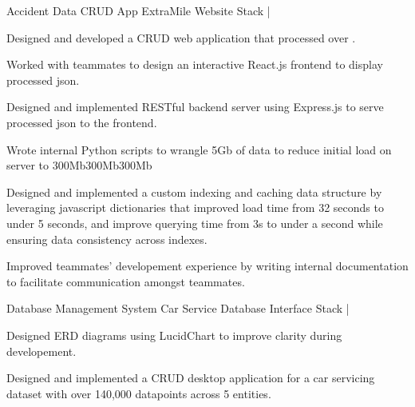 \begin{cventries}
    \cventry
    {Accident Data CRUD App} %
    {ExtraMile Website} %
    {\href{https://github.com/giathuan123/extramile}{\faGithubSquare}} %
    {Stack | \diExpressOriginal \diReactPlainWordmark \diNodejsPlain \diPythonPlain } %
    {
        \begin{cvitems} %
        \item{Designed and developed a CRUD web application that processed over . }
        \item{Worked with teammates to design an interactive React.js frontend to display processed json.}
        \item{Designed and implemented RESTful backend server using Express.js to serve processed json to the frontend. }
        \item{Wrote internal Python scripts to wrangle 5Gb of data to reduce initial load on server to 300Mb300Mb300Mb }
        \item{Designed and implemented a custom indexing and caching data structure by leveraging javascript dictionaries that improved load time from 32 seconds to under 5 seconds, and improve querying time from 3s to under a second while ensuring data consistency across indexes. }
        \item{Improved teammates' developement experience by writing internal documentation to facilitate communication amongst teammates. }
        \end{cvitems}
    }
    \cventry
    {Database Management System} %
    {Car Service Database Interface} %
    {\href{https://github.com/giathuan123/cs166-project}{\faGithubSquare}} %
    {Stack | \diJavaPlain \diPostgresqlPlain } %
    {
        \begin{cvitems} %
        \item{Designed ERD diagrams using LucidChart to improve clarity during developement. }
        \item{Designed and implemented a CRUD desktop application for a car servicing dataset with over 140,000 datapoints across 5 entities. }

\end{cvitems}}
\end{cventries}
